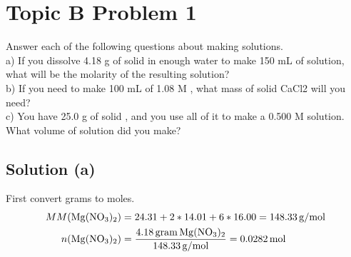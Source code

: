 \documentclass[10pt]{article}
\begin{document}



    \pagebreak
    \section{Topic B Problem 1}
        Answer each of the following questions about making solutions.\\
        a) If you dissolve 4.18 g of solid  in enough water to make 150 mL of solution, what will be the molarity of the resulting solution?\\
        b) If you need to make 100 mL of 1.08 M , what mass of solid CaCl2 will you need?\\
        c) You have 25.0 g of solid , and you use all of it to make a 0.500 M  solution. 
        What volume of solution did you make?

        \subsection{Solution (a)}
            First convert grams to moles.
            \begin{align}
                MM(\ce{Mg(NO3)2})   &=  24.31 + 2 * 14.01 + 6 * 16.00
                    =   148.33\,\unit{\gram/\mole}\\
                n(\ce{Mg(NO3)2})    &=  \frac{4.18\,\unit{gram}\,\ce{Mg(NO3)2}}{148.33\,\unit{\gram/\mole}}
                    =   0.0282\,\unit{\mole}
            \end{align}
\end{document}
